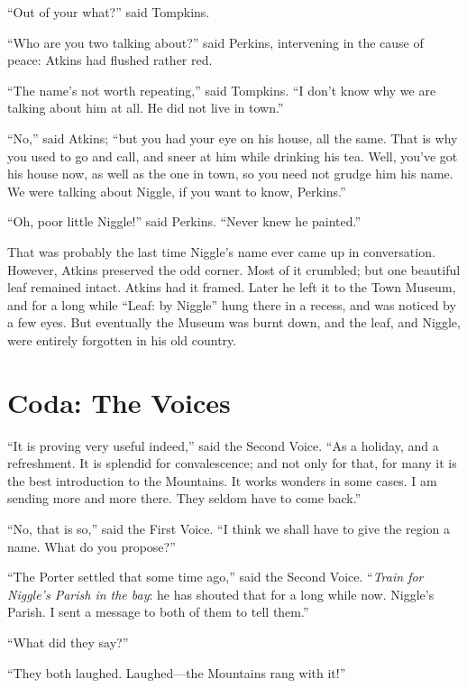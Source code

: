 “Out of your what?” said Tompkins.

“Who are you two talking about?” said Perkins, intervening in the cause of peace: Atkins had flushed rather red.

“The name’s not worth repeating,” said Tompkins. “I don’t know why we are talking about him at all. He did not live in town.”

“No,” said Atkins; “but you had your eye on his house, all the same. That is why you used to go and call, and sneer at him while drinking his tea. Well, you’ve got his house now, as well as the one in town, so you need not grudge him his name. We were talking about Niggle, if you want to know, Perkins.”

“Oh, poor little Niggle!” said Perkins. “Never knew he painted.”

That was probably the last time Niggle’s name ever came up in conversation. However, Atkins preserved the odd corner. Most of it crumbled; but one beautiful leaf remained intact. Atkins had it framed. Later he left it to the Town Museum, and for a long while “Leaf: by Niggle” hung there in a recess, and was noticed by a few eyes. But eventually the Museum was burnt down, and the leaf, and Niggle, were entirely forgotten in his old country.

\section*{Coda: The Voices}

“It is proving very useful indeed,” said the Second Voice. “As a holiday, and a refreshment. It is splendid for convalescence; and not only for that, for many it is the best introduction to the Mountains. It works wonders in some cases. I am sending more and more there. They seldom have to come back.”

“No, that is so,” said the First Voice. “I think we shall have to give the region a name. What do you propose?”

“The Porter settled that some time ago,” said the Second Voice. “\emph{Train for Niggle’s Parish in the bay}: he has shouted that for a long while now. Niggle’s Parish. I sent a message to both of them to tell them.”

“What did they say?”

“They both laughed. Laughed—the Mountains rang with it!”

\onlyscore{\bigskip\bigskip}

